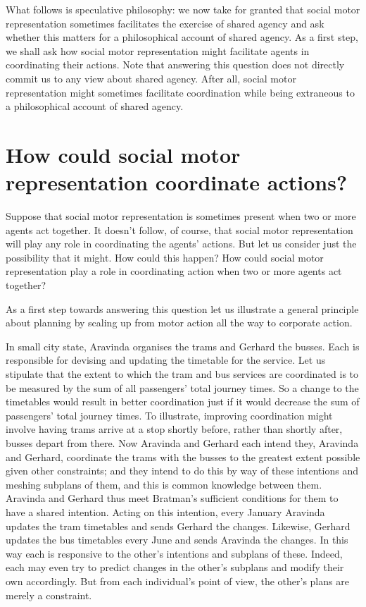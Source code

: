 \documentclass[12pt,\papersize]{extarticle}
\begin{document}
What follows is speculative philosophy: we now take for granted that  social motor representation sometimes facilitates the exercise of shared agency and ask whether this matters for a philosophical account of shared agency. 
As a first step, we shall ask how social motor representation might facilitate agents in coordinating their actions.
Note that answering this question does not directly commit us to any view about shared agency.
After all, social motor representation might sometimes facilitate coordination while being extraneous to a philosophical account of shared agency.


\section{How could social motor representation coordinate actions?}
Suppose that social motor representation is sometimes present when two or more agents act together.
It doesn't follow, of course, that social motor representation will play any role in coordinating the agents' actions.
But let us consider just the possibility that it might.
How could this happen?
How could social motor representation play a role in coordinating action when two or more agents act together?

As a first step towards answering  this question let us illustrate a general principle about planning by scaling up from motor action all the way to corporate action.

In small city state, Aravinda organises the trams and Gerhard the busses.
Each is responsible for devising and updating the timetable for the service.
Let us stipulate that the extent to which the tram and bus services are coordinated is to be measured by the sum of all passengers' total journey times.
So a change to the timetables would result in better coordination  just if it would decrease the sum of passengers' total journey times.
To illustrate, improving coordination might involve having trams arrive at a stop shortly before, rather than shortly after, busses depart from there.
Now Aravinda and Gerhard each intend they, Aravinda and Gerhard, coordinate the trams with the busses  to the greatest extent possible given other constraints; and they intend to do this by way of these intentions and meshing subplans of them, and this is common knowledge between them. 
Aravinda and Gerhard thus meet Bratman's sufficient conditions for them to have a shared intention.
Acting on this intention, 
every January Aravinda updates the tram timetables and sends Gerhard the changes.
Likewise, Gerhard  updates the bus timetables every June and sends Aravinda the changes.
In this way  each is responsive to the other's intentions and subplans of these. 
Indeed, each may even try to predict changes in the other's subplans and modify their own accordingly.  
But from each individual's point of view, the other's plans are  merely a constraint.
\end{document}
